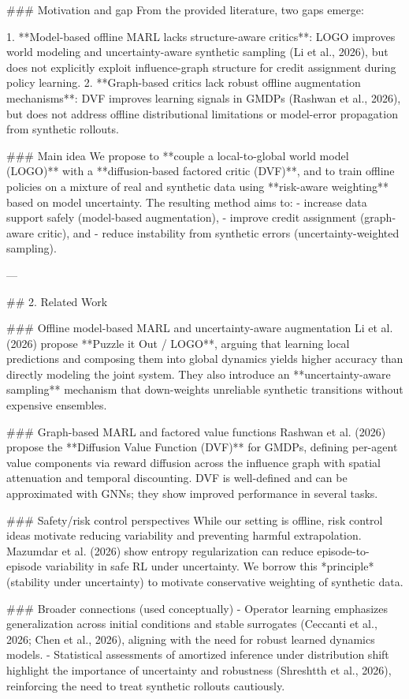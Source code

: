 ### Motivation and gap  
From the provided literature, two gaps emerge:

1. **Model-based offline MARL lacks structure-aware critics**: LOGO improves world modeling and uncertainty-aware synthetic sampling (Li et al., 2026), but does not explicitly exploit influence-graph structure for credit assignment during policy learning.  
2. **Graph-based critics lack robust offline augmentation mechanisms**: DVF improves learning signals in GMDPs (Rashwan et al., 2026), but does not address offline distributional limitations or model-error propagation from synthetic rollouts.

### Main idea  
We propose to **couple a local-to-global world model (LOGO)** with a **diffusion-based factored critic (DVF)**, and to train offline policies on a mixture of real and synthetic data using **risk-aware weighting** based on model uncertainty. The resulting method aims to:  
- increase data support safely (model-based augmentation),  
- improve credit assignment (graph-aware critic), and  
- reduce instability from synthetic errors (uncertainty-weighted sampling).

---

## 2. Related Work  

### Offline model-based MARL and uncertainty-aware augmentation  
Li et al. (2026) propose **Puzzle it Out / LOGO**, arguing that learning local predictions and composing them into global dynamics yields higher accuracy than directly modeling the joint system. They also introduce an **uncertainty-aware sampling** mechanism that down-weights unreliable synthetic transitions without expensive ensembles.

### Graph-based MARL and factored value functions  
Rashwan et al. (2026) propose the **Diffusion Value Function (DVF)** for GMDPs, defining per-agent value components via reward diffusion across the influence graph with spatial attenuation and temporal discounting. DVF is well-defined and can be approximated with GNNs; they show improved performance in several tasks.

### Safety/risk control perspectives  
While our setting is offline, risk control ideas motivate reducing variability and preventing harmful extrapolation. Mazumdar et al. (2026) show entropy regularization can reduce episode-to-episode variability in safe RL under uncertainty. We borrow this *principle* (stability under uncertainty) to motivate conservative weighting of synthetic data.

### Broader connections (used conceptually)  
- Operator learning emphasizes generalization across initial conditions and stable surrogates (Ceccanti et al., 2026; Chen et al., 2026), aligning with the need for robust learned dynamics models.  
- Statistical assessments of amortized inference under distribution shift highlight the importance of uncertainty and robustness (Shreshtth et al., 2026), reinforcing the need to treat synthetic rollouts cautiously.

